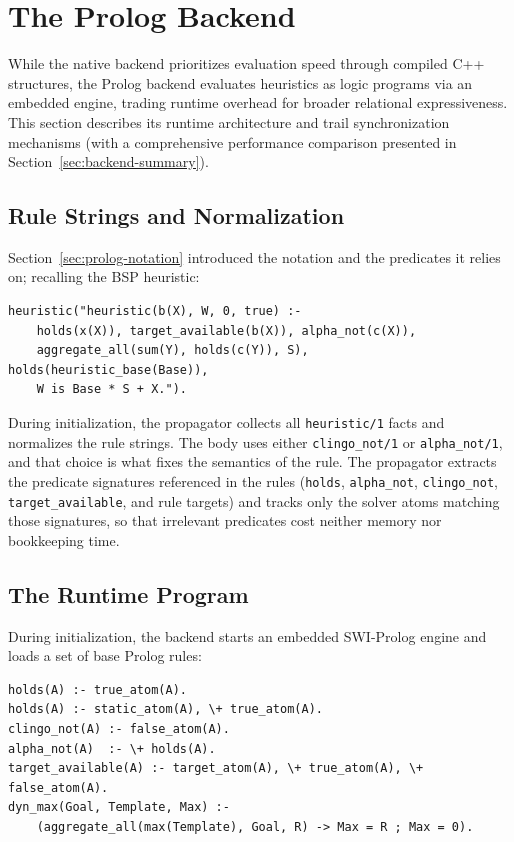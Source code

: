 \section{The Prolog Backend}

While the native backend prioritizes evaluation speed through compiled C++ structures, the Prolog backend evaluates heuristics as logic programs via an embedded engine, trading runtime overhead for broader relational expressiveness. This section describes its runtime architecture and trail synchronization mechanisms (with a comprehensive performance comparison presented in Section~\ref{sec:backend-summary}).

\subsection{Rule Strings and Normalization}
\label{sec:prolog-syntax}

Section~\ref{sec:prolog-notation} introduced the notation and the predicates it relies on; recalling the BSP heuristic:

\begin{verbatim}
heuristic("heuristic(b(X), W, 0, true) :-
    holds(x(X)), target_available(b(X)), alpha_not(c(X)),
    aggregate_all(sum(Y), holds(c(Y)), S), holds(heuristic_base(Base)),
    W is Base * S + X.").
\end{verbatim}

During initialization, the propagator collects all \texttt{heuristic/1} facts and normalizes the rule strings. The body uses either \texttt{clingo\_not/1} or \texttt{alpha\_not/1}, and that choice is what fixes the semantics of the rule. The propagator extracts the predicate signatures referenced in the rules (\texttt{holds}, \texttt{alpha\_not}, \texttt{clingo\_not}, \texttt{target\_available}, and rule targets) and tracks only the solver atoms matching those signatures, so that irrelevant predicates cost neither memory nor bookkeeping time.

\subsection{The Runtime Program}

During initialization, the backend starts an embedded SWI-Prolog engine \cite{wielemaker2012swipl} and loads a set of base Prolog rules:

\begin{verbatim}
holds(A) :- true_atom(A).
holds(A) :- static_atom(A), \+ true_atom(A).
clingo_not(A) :- false_atom(A).
alpha_not(A)  :- \+ holds(A).
target_available(A) :- target_atom(A), \+ true_atom(A), \+ false_atom(A).
dyn_max(Goal, Template, Max) :-
    (aggregate_all(max(Template), Goal, R) -> Max = R ; Max = 0).
\end{verbatim}

